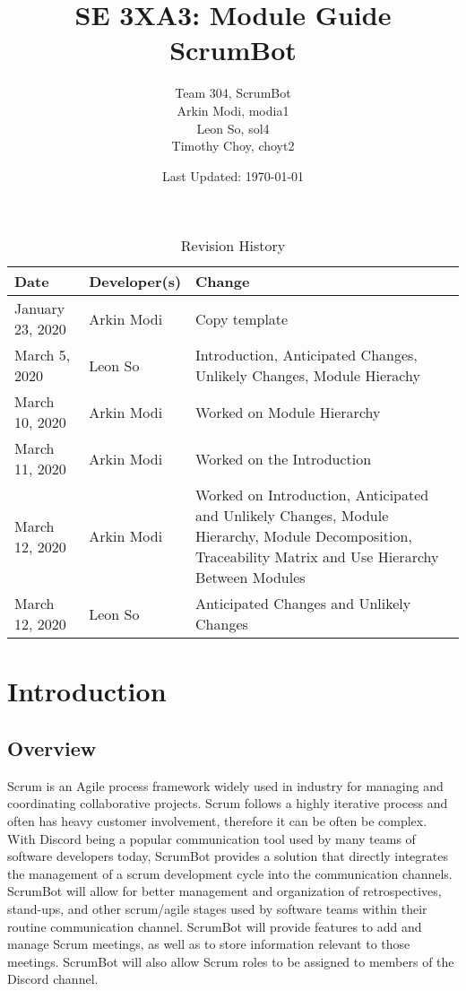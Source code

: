 \documentclass[12pt, titlepage]{article}
\title{SE 3XA3: Module Guide\\ScrumBot}
\author{
	Team 304, ScrumBot
		\\ Arkin Modi, modia1
        \\ Leon So, sol4
        \\ Timothy Choy, choyt2
}
\date{Last Updated: \today}
\begin{document}
\maketitle

\tableofcontents
\listoftables
\listoffigures

\begin{table}[H]
    \caption{Revision History} \label{TblRevisionHistory}
    \begin{tabularx}{\textwidth}{llX}
        \toprule
            \textbf{Date} & \textbf{Developer(s)} & \textbf{Change}\\
        \midrule
            January 23, 2020 & Arkin Modi & Copy template\\
            March 5, 2020 & Leon So & Introduction, Anticipated Changes, Unlikely Changes, Module Hierachy\\
            March 10, 2020 & Arkin Modi & Worked on Module Hierarchy\\
            March 11, 2020 & Arkin Modi & Worked on the Introduction\\
            March 12, 2020 & Arkin Modi & Worked on Introduction, Anticipated and Unlikely Changes, Module Hierarchy, Module Decomposition, Traceability Matrix and Use Hierarchy Between Modules\\
            March 12, 2020 & Leon So & Anticipated Changes and Unlikely Changes\\
        \bottomrule
    \end{tabularx}
\end{table}

\newpage


\section{Introduction}
\subsection{Overview} 
Scrum is an Agile process framework widely used in industry for managing and coordinating collaborative projects. Scrum follows a highly iterative process and often has heavy customer involvement, therefore it can be often be complex. With Discord being a popular communication tool used by many teams of software developers today, ScrumBot provides a solution that directly integrates the management of a scrum development cycle into the communication channels. ScrumBot will allow for better management and organization of retrospectives, stand-ups, and other scrum/agile stages used by software teams within their routine communication channel. ScrumBot will provide features to add and manage Scrum meetings, as well as to store information relevant to those meetings. ScrumBot will also allow Scrum roles to be assigned to members of the Discord channel.
\end{document}
